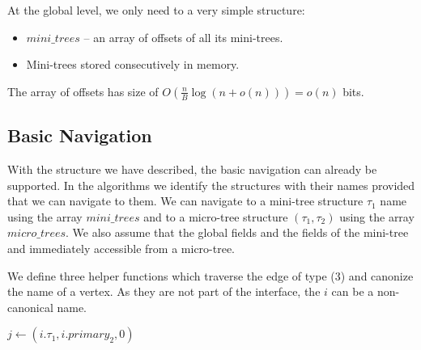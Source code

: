 \bigskip

At the global level, we only need to a very simple structure:
\begin{itemize}
	\item $mini\_trees$ -- an array of offsets of all its mini-trees.
	\item Mini-trees stored consecutively in memory.
\end{itemize}

The array of offsets has size of $O(\frac{n}{B} \log (n + o(n))) = o(n)$ bits.

\subsection{Basic Navigation}

With the structure we have described, the basic navigation can already be supported.
In the algorithms we identify the structures with their names provided that we can navigate to them.
We can navigate to a mini-tree structure $\tau_1$ name using the array $mini\_trees$ and to a micro-tree structure $(\tau_1, \tau_2)$ using the array $micro\_trees$.
We also assume that the global fields and the fields of the mini-tree and immediately accessible from a micro-tree.

We define three helper functions which traverse the edge of type (3) and canonize the name of a vertex.
As they are not part of the interface, the $i$ can be a non-canonical name.

\begin{algorithmic}
			\State {}
		\Else
			\State {}
		\EndIf
	\Else
		\State {}
	\EndIf
\EndFunction
\end{algorithmic}

\begin{algorithmic}
			\State {}
		\Else
			\State {}
		\EndIf
	\Else
		\State {}
	\EndIf
\EndFunction
\end{algorithmic}

\begin{algorithmic}
		\State {}
	\Else
		\State $j \gets (i.\tau_1, i.primary_2, 0)$
			\State {}
		\Else
			\State {}
		\EndIf
	\EndIf
\EndFunction
\end{algorithmic}

